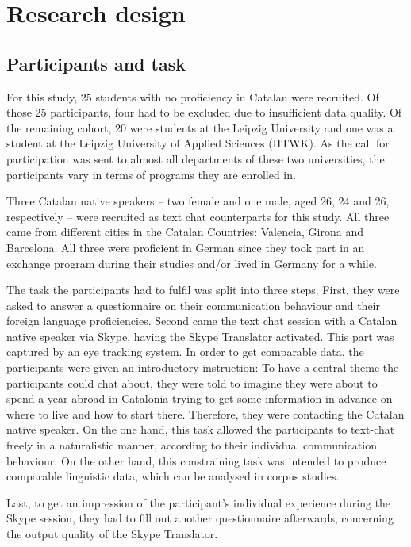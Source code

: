 \documentclass[output=paper]{langscibook}
\begin{document}

\section{Research design}
\label{sec:Rdesign}

\subsection{Participants and task}\largerpage
\label{subsec:parttask}
For this study, 25 students with no proficiency in Catalan were recruited. Of those 25 participants, four had to be excluded due to insufficient data quality. Of the remaining cohort, 20 were students at the Leipzig University and one was a student at the Leipzig University of Applied Sciences (HTWK). As the call for participation was sent to almost all departments of these two universities, the participants vary in terms of programs they are enrolled in.

Three Catalan native speakers -- two female and one male, aged 26, 24 and 26, respectively -- were recruited as text chat counterparts for this study. All three came from different cities in the Catalan Countries: Valencia, Girona and Barcelona. All three were proficient in German since they took part in an exchange program during their studies and/or lived in Germany for a while.

The task the participants had to fulfil was split into three steps. First, they were asked to answer a questionnaire on their communication behaviour and their foreign language proficiencies. Second came the text chat session with a Catalan native speaker via Skype, having the Skype Translator activated. This part was captured by an eye tracking system. In order to get comparable data, the participants were given an introductory instruction: To have a central theme the participants could chat about, they were told to imagine they were about to spend a year abroad in Catalonia trying to get some information in advance on where to live and how to start there. Therefore, they were contacting the Catalan native speaker. On the one hand, this task allowed the participants to text-chat freely in a naturalistic manner, according to their individual communication behaviour. On the other hand, this constraining task was intended to produce comparable linguistic data, which can be analysed in corpus studies. 

Last, to get an impression of the participant's individual experience during the Skype session, they had to fill out another questionnaire afterwards, concerning the output quality of the Skype Translator.
\end{document}
